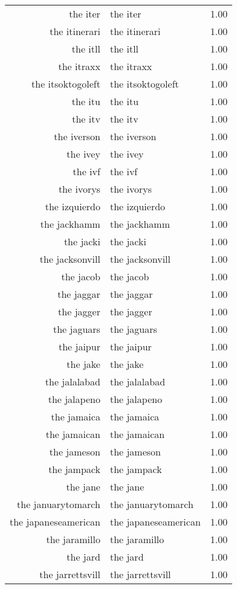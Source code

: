 \begin{table}[ht]
\begin{tabular}{rlr}
  the iter & the iter & 1.00 \\ 
  the itinerari & the itinerari & 1.00 \\ 
  the itll & the itll & 1.00 \\ 
  the itraxx & the itraxx & 1.00 \\ 
  the itsoktogoleft & the itsoktogoleft & 1.00 \\ 
  the itu & the itu & 1.00 \\ 
  the itv & the itv & 1.00 \\ 
  the iverson & the iverson & 1.00 \\ 
  the ivey & the ivey & 1.00 \\ 
  the ivf & the ivf & 1.00 \\ 
  the ivorys & the ivorys & 1.00 \\ 
  the izquierdo & the izquierdo & 1.00 \\ 
  the jackhamm & the jackhamm & 1.00 \\ 
  the jacki & the jacki & 1.00 \\ 
  the jacksonvill & the jacksonvill & 1.00 \\ 
  the jacob & the jacob & 1.00 \\ 
  the jaggar & the jaggar & 1.00 \\ 
  the jagger & the jagger & 1.00 \\ 
  the jaguars & the jaguars & 1.00 \\ 
  the jaipur & the jaipur & 1.00 \\ 
  the jake & the jake & 1.00 \\ 
  the jalalabad & the jalalabad & 1.00 \\ 
  the jalapeno & the jalapeno & 1.00 \\ 
  the jamaica & the jamaica & 1.00 \\ 
  the jamaican & the jamaican & 1.00 \\ 
  the jameson & the jameson & 1.00 \\ 
  the jampack & the jampack & 1.00 \\ 
  the jane & the jane & 1.00 \\ 
  the januarytomarch & the januarytomarch & 1.00 \\ 
  the japaneseamerican & the japaneseamerican & 1.00 \\ 
  the jaramillo & the jaramillo & 1.00 \\ 
  the jard & the jard & 1.00 \\ 
  the jarrettsvill & the jarrettsvill & 1.00 \\ 

\end{tabular}
\end{table}
